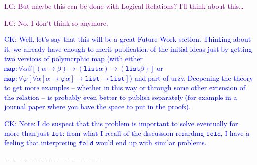 \documentclass[runningheads,a4paper]{llncs}
\newcommand{\arrtype}{\rightarrow}
\newcommand{\CK}[1]{\textcolor{blue}{CK: #1}}
\newcommand{\LC}[1]{\textcolor{purple}{LC: #1}}
\begin{document}
\LC{But maybe this can be done with Logical Relations? I'll think
  about this\ldots}

\LC{No, I don't think so anymore.}

\CK{Well, let's say that this will be a great Future Work section.
  Thinking about it, we already have enough to merit publication
  of the initial ideas just by getting two versions of polymorphic
  map (with either
  $\mathtt{map} : \forall\alpha\beta [(\alpha \arrtype \beta) \arrtype
  (\mathtt{list} \alpha) \arrtype (\mathtt{list} \beta)]$ or
  $\mathtt{map} : \forall \varphi [
  \forall \alpha [\alpha \arrtype \varphi\alpha]
  \arrtype \mathtt{list} \arrtype \mathtt{list}]$) and part of urzy.
  Deepening the theory to get more examples -- whether in this way or
  through some other extension of the relation -- is probably even
  better to publish separately (for example in a journal paper where
  you have the space to put in the proofs).}

\CK{Note: I do suspect that this problem is important to solve
  eventually for more than just $\mathtt{let}$: from what I recall of
  the discussion regarding $\mathtt{fold}$, I have a feeling that
  interpreting $\mathtt{fold}$ would end up with similar problems.}

==================

\newpage
\end{document}
